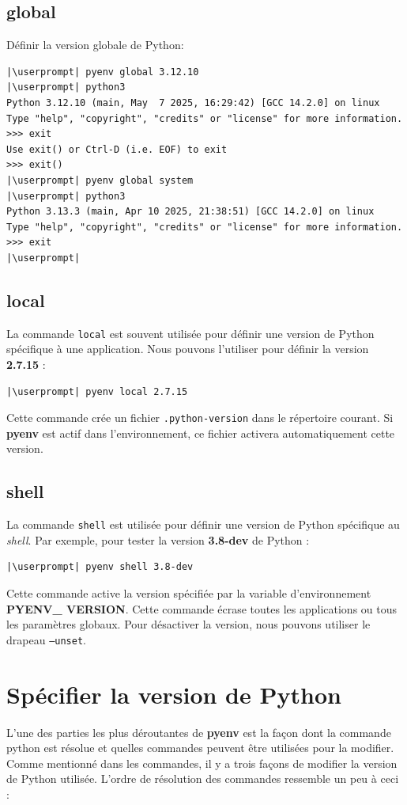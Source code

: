 \subsection*{global}
Définir la version globale de Python:
\begin{lstlisting}[style=bash]
|\userprompt| pyenv global 3.12.10
|\userprompt| python3
Python 3.12.10 (main, May  7 2025, 16:29:42) [GCC 14.2.0] on linux
Type "help", "copyright", "credits" or "license" for more information.
>>> exit
Use exit() or Ctrl-D (i.e. EOF) to exit
>>> exit()
|\userprompt| pyenv global system
|\userprompt| python3
Python 3.13.3 (main, Apr 10 2025, 21:38:51) [GCC 14.2.0] on linux
Type "help", "copyright", "credits" or "license" for more information.
>>> exit
|\userprompt|
\end{lstlisting}

\subsection*{local}
La commande \texttt{local} est souvent utilisée pour définir une version de Python spécifique à une application. Nous pouvons l'utiliser pour définir la version \textbf{2.7.15} :
\begin{lstlisting}[style=bash]
|\userprompt| pyenv local 2.7.15
\end{lstlisting}

Cette commande crée un fichier \texttt{.python-version} dans le répertoire courant. Si \textbf{pyenv} est actif dans l'environnement, ce fichier activera automatiquement cette version.

\subsection*{shell}
La commande \texttt{shell} est utilisée pour définir une version de Python spécifique au \textit{shell}. Par exemple, pour tester la version \textbf{3.8-dev} de Python :
\begin{lstlisting}[style=bash]
|\userprompt| pyenv shell 3.8-dev
\end{lstlisting}

Cette commande active la version spécifiée par la variable d'environnement \textbf{PYENV\_ VERSION}. Cette commande écrase toutes les applications ou tous les paramètres globaux. Pour désactiver la version, nous pouvons utiliser le drapeau \texttt{--unset}.

\section{Spécifier la version de Python}
L'une des parties les plus déroutantes de \textbf{pyenv} est la façon dont la commande python est résolue et quelles commandes peuvent être utilisées pour la modifier. Comme mentionné dans les commandes, il y a trois façons de modifier la version de Python utilisée. L'ordre de résolution des commandes ressemble un peu à ceci :

